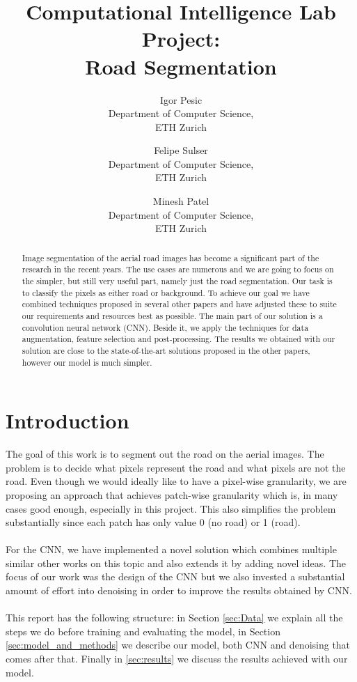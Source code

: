 \documentclass[10pt,conference,compsocconf]{IEEEtran}
\begin{document}
\title{Computational Intelligence Lab Project:\\ Road Segmentation}

\author{
  Igor Pesic\\
  Department of Computer Science,\\ ETH Zurich
  \and
  Felipe Sulser\\
  Department of Computer Science,\\ ETH Zurich
  \and
  Minesh Patel\\
  Department of Computer Science,\\ ETH Zurich
}

\maketitle

\begin{abstract}
  Image segmentation of the aerial road images has become a significant part of the research in the recent years.
  The use cases are numerous and we are going to focus on the simpler, but still very useful part, namely just the road
  segmentation. Our task is to classify the pixels as either road or background. To achieve our goal we have combined
  techniques proposed in several other papers and have adjusted these to suite our requirements and resources best as possible.  
  The main part of our solution is a convolution neural network (CNN). Beside it, we apply the techniques for data augmentation,
  feature selection and post-processing. The results we obtained with our solution are close to the state-of-the-art
  solutions proposed in the other papers, however our model is much simpler.
\end{abstract}

\section{Introduction}

The goal of this work is to segment out the road on the aerial images. The problem is to decide what pixels
represent the road and what pixels are not the road. Even though we would ideally like to have a pixel-wise
granularity, we are proposing an approach that achieves patch-wise granularity which is, in many cases good enough,
especially in this project. This also simplifies the problem substantially since each patch has only value 0 (no road) or 1 (road). \\
\\
For the CNN, we have implemented a novel solution which combines multiple similar other works on this topic 
and also extends it by adding novel ideas. The focus of our work was the design of the
CNN but we also invested a substantial amount of effort into denoising in order
to improve the results obtained by CNN.\\
\\
This report has the following structure: in Section \ref{sec:Data} we explain all the steps we do before training
and evaluating the model, in Section \ref{sec:model_and_methods} we describe our model, both CNN and denoising
that comes after that. Finally in \ref{sec:results} we discuss the results achieved with our model.
\end{document}
